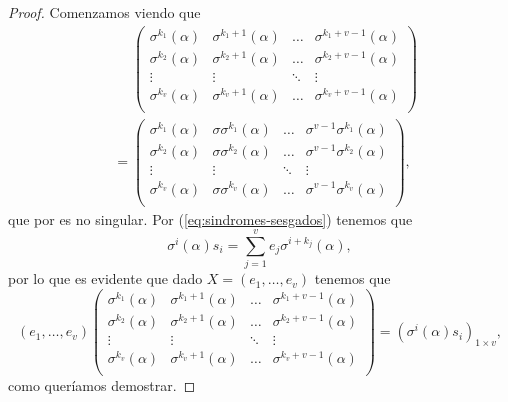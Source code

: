 \begin{proof}
  Comenzamos viendo que
  \begin{align*}
    &\phantom{={}} \begin{pmatrix}
      \sigma^{k_1}(\alpha) & \sigma^{k_1 + 1}(\alpha) & \dots & \sigma^{k_1 + v - 1}(\alpha)\\ 
      \sigma^{k_2}(\alpha) & \sigma^{k_2 + 1}(\alpha) & \dots & \sigma^{k_2 + v - 1}(\alpha)\\ 
      \vdots & \vdots & \ddots & \vdots\\ 
      \sigma^{k_v}(\alpha) & \sigma^{k_v + 1}(\alpha) & \dots & \sigma^{k_v + v - 1}(\alpha)\\ 
     \end{pmatrix}\\
     &= \begin{pmatrix}
      \sigma^{k_1}(\alpha) & \sigma\sigma^{k_1}(\alpha) & \dots & \sigma^{v - 1}\sigma^{k_1}(\alpha)\\ 
      \sigma^{k_2}(\alpha) & \sigma\sigma^{k_2}(\alpha) & \dots & \sigma^{v - 1}\sigma^{k_2}(\alpha)\\ 
      \vdots & \vdots & \ddots & \vdots\\ 
      \sigma^{k_v}(\alpha) & \sigma\sigma^{k_v}(\alpha) & \dots & \sigma^{v - 1}\sigma^{k_v}(\alpha)\\ 
     \end{pmatrix},
  \end{align*}
  que por \parencite[Lema 2.1]{gomez-torrecillas_petersongorensteinzierler_2018} es no singular.
  Por (\ref{eq:sindromes-sesgados}) tenemos que 
  \[
    \sigma^{i}(\alpha)s_i = \sum_{j = 1}^{v}e_j\sigma^{i + k_j}(\alpha),
  \]
  por lo que es evidente que dado \(X = (e_1, \dots, e_v)\) tenemos que
  \[
    (e_1, \dots, e_v) \begin{pmatrix}
      \sigma^{k_1}(\alpha) & \sigma^{k_1 + 1}(\alpha) & \dots & \sigma^{k_1 + v - 1}(\alpha)\\ 
      \sigma^{k_2}(\alpha) & \sigma^{k_2 + 1}(\alpha) & \dots & \sigma^{k_2 + v - 1}(\alpha)\\ 
      \vdots & \vdots & \ddots & \vdots\\ 
      \sigma^{k_v}(\alpha) & \sigma^{k_v + 1}(\alpha) & \dots & \sigma^{k_v + v - 1}(\alpha)\\ 
     \end{pmatrix} = \left(\sigma^{i}(\alpha)s_i\right)_{1 \times v},
  \]
  como queríamos demostrar.
\end{proof}

